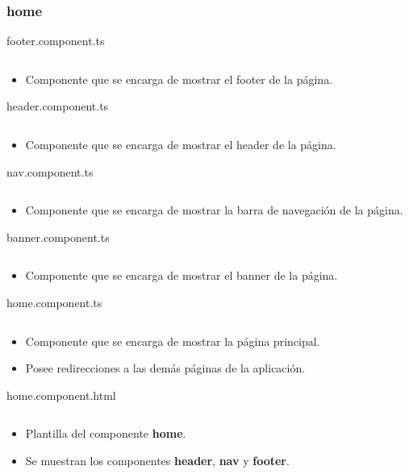 \documentclass{article}
\newenvironment{block}{\captionsetup{type=listing}}{}
\begin{document}
\subsubsection{home}
\begin{block}
	\caption{footer.component.ts}
	\inputminted[breaklines]{TypeScript}{kioskios_web/src/app/home/footer/footer.component.ts}
	\begin{itemize}
		\item Componente que se encarga de mostrar el footer de la página.
	\end{itemize}

	\caption[breaklines]{header.component.ts}
	\inputminted{TypeScript}{kioskios_web/src/app/home/header/header.component.ts}
	\begin{itemize}
		\item Componente que se encarga de mostrar el header de la página.
	\end{itemize}

	\caption[breaklines]{nav.component.ts}
	\inputminted{TypeScript}{kioskios_web/src/app/home/nav/nav.component.ts}
	\begin{itemize}
		\item Componente que se encarga de mostrar la barra de navegación de la página.
	\end{itemize}

	\caption[breaklines]{banner.component.ts}
	\inputminted{TypeScript}{kioskios_web/src/app/home/banner/banner.component.ts}
	\begin{itemize}
		\item Componente que se encarga de mostrar el banner de la página.
	\end{itemize}

	\caption{home.component.ts}
	\inputminted{TypeScript}{kioskios_web/src/app/home/home.component.ts}
	\begin{itemize}
		\item Componente que se encarga de mostrar la página principal.
		\item Posee redirecciones a las demás páginas de la aplicación.
	\end{itemize}

	\caption{home.component.html}
	\inputminted{HTML}{kioskios_web/src/app/home/home.component.html}
	\begin{itemize}
		\item Plantilla del componente \textbf{home}.
		\item Se muestran los componentes \textbf{header}, \textbf{nav} y \textbf{footer}.
	\end{itemize}
\end{block}
\end{document}
